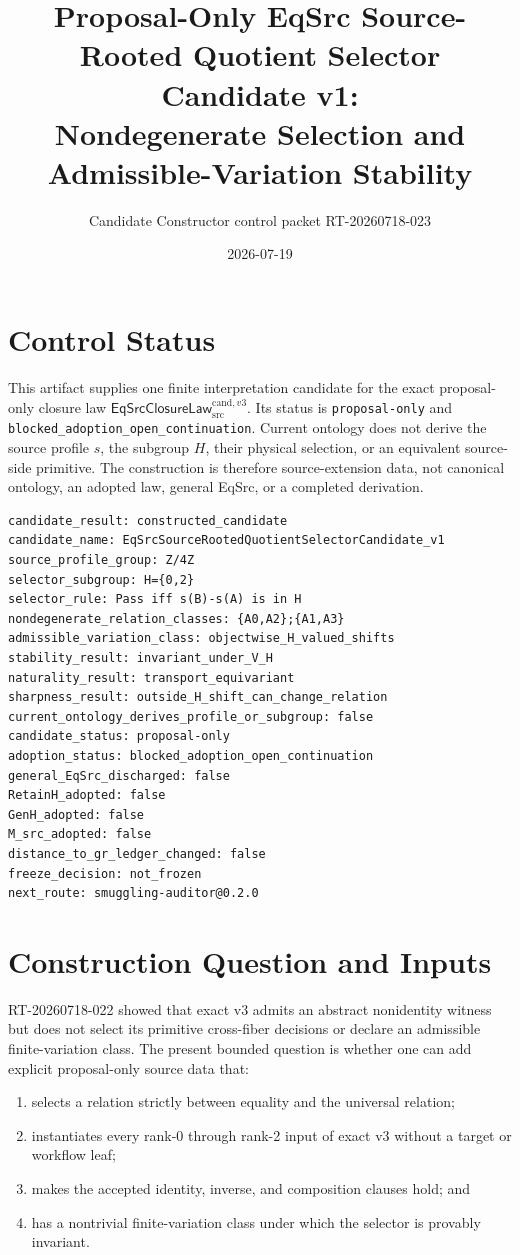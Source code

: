 \documentclass[11pt]{article}
\title{Proposal-Only EqSrc Source-Rooted Quotient Selector Candidate v1:\\
Nondegenerate Selection and Admissible-Variation Stability}
\author{Candidate Constructor control packet RT-20260718-023}
\date{2026-07-19}
\newcommand{\Law}{\mathsf{EqSrcClosureLaw}^{\mathrm{cand},v3}_{\mathrm{src}}}
\begin{document}
\maketitle

\section{Control Status}

This artifact supplies one finite interpretation candidate for the exact
proposal-only closure law \(\Law\). Its status is
\texttt{proposal-only} and
\texttt{blocked\_adoption\_open\_continuation}. Current ontology does not
derive the source profile \(s\), the subgroup \(H\), their physical
selection, or an equivalent source-side primitive. The construction is
therefore source-extension data, not canonical ontology, an adopted law,
general EqSrc, or a completed derivation.

\begin{verbatim}
candidate_result: constructed_candidate
candidate_name: EqSrcSourceRootedQuotientSelectorCandidate_v1
source_profile_group: Z/4Z
selector_subgroup: H={0,2}
selector_rule: Pass iff s(B)-s(A) is in H
nondegenerate_relation_classes: {A0,A2};{A1,A3}
admissible_variation_class: objectwise_H_valued_shifts
stability_result: invariant_under_V_H
naturality_result: transport_equivariant
sharpness_result: outside_H_shift_can_change_relation
current_ontology_derives_profile_or_subgroup: false
candidate_status: proposal-only
adoption_status: blocked_adoption_open_continuation
general_EqSrc_discharged: false
RetainH_adopted: false
GenH_adopted: false
M_src_adopted: false
distance_to_gr_ledger_changed: false
freeze_decision: not_frozen
next_route: smuggling-auditor@0.2.0
\end{verbatim}

\section{Construction Question and Inputs}

RT-20260718-022 showed that exact v3 admits an abstract nonidentity witness but
does not select its primitive cross-fiber decisions or declare an admissible
finite-variation class. The present bounded question is whether one can add
explicit proposal-only source data that:
\begin{enumerate}[leftmargin=*]
  \item selects a relation strictly between equality and the universal
  relation;
  \item instantiates every rank-0 through rank-2 input of exact v3 without a
  target or workflow leaf;
  \item makes the accepted identity, inverse, and composition clauses hold;
  and
  \item has a nontrivial finite-variation class under which the selector is
  provably invariant.
\end{enumerate}
\end{document}
